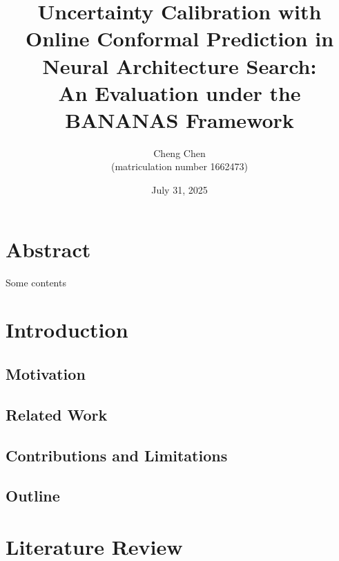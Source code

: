\documentclass[a4paper,oneside,bibliography=totoc]{scrbook}
\begin{document}
\frontmatter \subject{Master Thesis} %
\title{\LARGE 
	Uncertainty Calibration with Online Conformal Prediction in Neural Architecture Search: \\ 
	An Evaluation under the BANANAS Framework 
}
\author{
	Cheng Chen\\ (matriculation number 1662473)} \date{July 31, 2025
}
\publishers{
	{\small Submitted to}\\
	Data and Web Science Group\\Prof.\ Dr.\ Margret Keuper\\University of Mannheim\\
}
\maketitle

\chapter{Abstract}
Some contents


\begingroup%
\hypersetup{hidelinks} %
\tableofcontents%
\endgroup


\listofalgorithms 
\listoffigures 
\listoftables


\mainmatter  %

\chapter{Introduction}
\label{ch:intro}

\section{Motivation}
\section{Related Work}
\section{Contributions and Limitations}
\section{Outline}


\chapter{Literature Review}
\label{ch:related_work}
\end{document}
